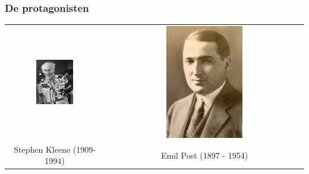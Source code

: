 \documentclass{beamer}
\begin{document}
\begin{frame}
    \frametitle{De protagonisten}
    \begin{tabular*}{\textwidth}{c c}
        \includegraphics[width=0.4\textwidth]{Kleene.jpeg} & \includegraphics[width=0.4\textwidth]{Post.jpg} \\
        {\large Stephen Kleene} (1909-1994) & {\large Emil Post} (1897 - 1954)\\
    \end{tabular*}
\end{frame}
\end{document}
